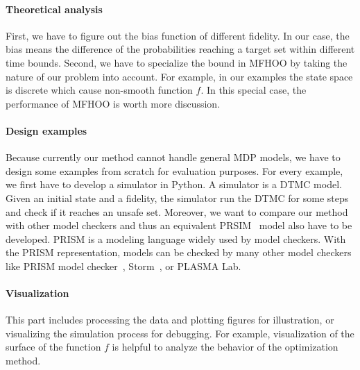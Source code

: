 \documentclass[11pt]{article}
\begin{document}
\paragraph{Theoretical analysis} First, we have to figure out the bias function of different fidelity. In our case, the bias means the difference of the probabilities reaching a target set within different time bounds. Second, we have to specialize the bound in MFHOO by taking the nature of our problem into account. For example, in our examples the state space is discrete which cause non-smooth function $f$. In this special case, the performance of MFHOO is worth more discussion.

\paragraph{Design examples} Because currently our method cannot handle general MDP models, we have to design some examples from scratch for evaluation purposes. For every example, we first have to develop a simulator in Python. A simulator is a DTMC model. Given an initial state and a fidelity, the simulator run the DTMC for some steps and check if it reaches an unsafe set. Moreover, we want to compare our method with other model checkers and thus an equivalent PRSIM~\cite{kwiatkowska2011prism} model also have to be developed. PRISM is a modeling language widely used by model checkers. With the PRISM representation, models can be checked by many other model checkers like PRISM model checker~\cite{kwiatkowska2011prism}, Storm~\cite{dehnert2017storm}, or PLASMA Lab\cite{legay2016plasma}.

\paragraph{Visualization}
This part includes processing the data and plotting figures for illustration, or visualizing the simulation process for debugging. For example, visualization of the surface of the function $f$ is helpful to analyze the behavior of the optimization method.



\end{document}
